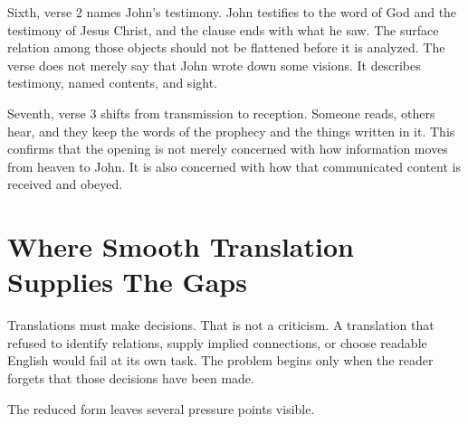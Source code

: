 Sixth, verse 2 names John's testimony. John testifies to the word of God and the testimony of Jesus Christ, and the clause ends with what he saw. The surface relation among those objects should not be flattened before it is analyzed. The verse does not merely say that John wrote down some visions. It describes testimony, named contents, and sight.

Seventh, verse 3 shifts from transmission to reception. Someone reads, others hear, and they keep the words of the prophecy and the things written in it. This confirms that the opening is not merely concerned with how information moves from heaven to John. It is also concerned with how that communicated content is received and obeyed.

\section{Where Smooth Translation Supplies The Gaps}

Translations must make decisions. That is not a criticism. A translation that refused to identify relations, supply implied connections, or choose readable English would fail at its own task. The problem begins only when the reader forgets that those decisions have been made.

The reduced form leaves several pressure points visible.

